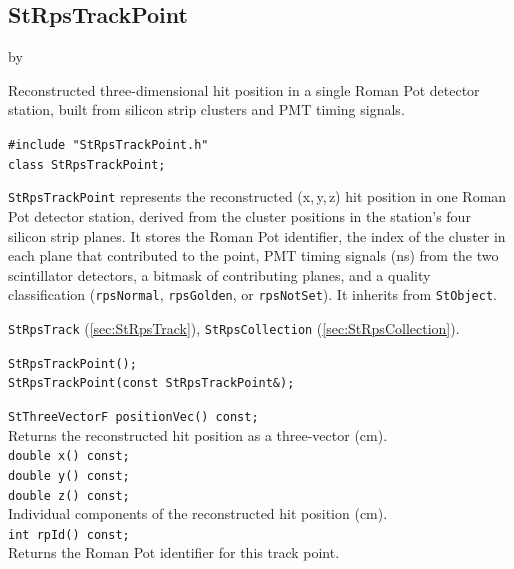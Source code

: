 \documentclass[twoside]{article}
\newcommand{\entrylabel}[1]{\mbox{\textbf{{#1}}}\hfil}%
\newenvironment{entry}
{\begin{list}{}%
    {\renewcommand{\makelabel}{\entrylabel}%
     \setlength{\labelwidth}{90pt}%
     \setlength{\leftmargin}{\labelwidth}
     \advance\leftmargin by \labelsep%
      }%
    }%
  {\end{list}}
\newcommand{\Entrylabel}[1]%
{\raisebox{0pt}[1ex][0pt]{\makebox[\labelwidth][l]%
    {\parbox[t]{\labelwidth}{\hspace{0pt}\textbf{{#1}}}}}}
\newenvironment{Entry}%
{\renewcommand{\entrylabel}{\Entrylabel}\begin{entry}}%
  {\end{entry}}
\begin{document}
\subsection{StRpsTrackPoint}
\label{sec:StRpsTrackPoint}
\begin{Entry}
\item[Summary] Reconstructed three-dimensional hit position in a single Roman Pot
    detector station, built from silicon strip clusters and PMT timing signals.
\item[Synopsis]
    \verb+#include "StRpsTrackPoint.h"+\\
    \verb+class StRpsTrackPoint;+\\
\item[Description]
    \texttt{StRpsTrackPoint} represents the reconstructed (x,\,y,\,z) hit
    position in one Roman Pot detector station, derived from the cluster
    positions in the station's four silicon strip planes.  It stores the
    Roman Pot identifier, the index of the cluster in each plane that
    contributed to the point, PMT timing signals (ns) from the two scintillator
    detectors, a bitmask of contributing planes, and a quality classification
    (\texttt{rpsNormal}, \texttt{rpsGolden}, or \texttt{rpsNotSet}).
    It inherits from \texttt{StObject}.
\item[Related Classes]
    \texttt{StRpsTrack} (\ref{sec:StRpsTrack}),
    \texttt{StRpsCollection} (\ref{sec:StRpsCollection}).
\item[Public\\ Constructors]
    \verb+StRpsTrackPoint();+\\
    \verb+StRpsTrackPoint(const StRpsTrackPoint&);+\\
\item[Public Member\\ Functions]
    \verb+StThreeVectorF positionVec() const;+\\
    Returns the reconstructed hit position as a three-vector (cm).\\
    \verb+double x() const;+\\
    \verb+double y() const;+\\
    \verb+double z() const;+\\
    Individual components of the reconstructed hit position (cm).\\
    \verb+int rpId() const;+\\
    Returns the Roman Pot identifier for this track point.\\

\end{Entry}
\end{document}
